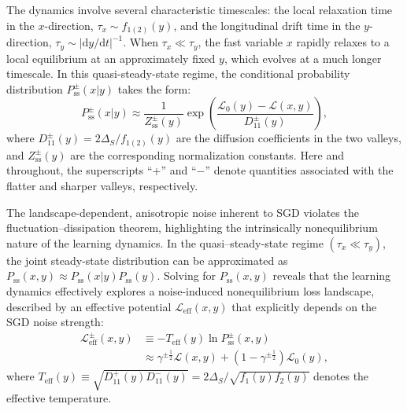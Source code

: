\documentclass[aps,prx,reprint,superscriptaddress,longbibliography,nofootinbib,floatfix]{revtex4-2}
\begin{document}
The dynamics involve several characteristic timescales: the local relaxation time in the $x$-direction, $\tau_x \sim f_{1(2)}(y)$, and the longitudinal drift time in the $y$-direction, $\tau_y \sim |\mathrm{d}y/\mathrm{d}t|^{-1}$. When $\tau_x \ll \tau_y$, the fast variable $x$ rapidly relaxes to a local equilibrium at an approximately fixed $y$, which evolves at a much longer timescale. In this quasi-steady-state regime, the conditional probability distribution $P_\mathrm{ss}^{\pm}(x|y)$ takes the form:
\begin{equation}
    P_\mathrm{ss}^{\pm}(x|y) \approx 
    \frac{1}{Z_\mathrm{ss}^{\pm}(y)}
    \exp\!\left(\frac{\mathcal{L}_0(y) - \mathcal{L}(x,y)}{D_{11}^{\pm}(y)}\right),
\end{equation}
where $D_{11}^{\pm}(y) = 2\Delta_S / f_{1(2)}(y)$ are the diffusion coefficients in the two valleys, and $Z_\mathrm{ss}^{\pm}(y)$ are the corresponding normalization constants. Here and throughout, the superscripts “$+$” and “$-$” denote quantities associated with the flatter and sharper valleys, respectively. 

The landscape-dependent, anisotropic noise inherent to SGD violates the fluctuation–dissipation theorem, highlighting the intrinsically nonequilibrium nature of the learning dynamics. In the quasi–steady-state regime $(\tau_x\ll \tau_y)$, the joint steady-state distribution can be approximated as $P_{\mathrm{ss}}(x,y) \approx P_{\mathrm{ss}}(x|y)P_{\mathrm{ss}}(y)$. Solving for $P_{\mathrm{ss}}(x,y)$ reveals that the learning dynamics effectively explores a noise-induced nonequilibrium loss landscape, described by an effective potential $\mathcal{L}_{\mathrm{eff}}(x,y)$ that explicitly depends on the SGD noise strength:
\begin{equation}
\begin{split}
    \mathcal{L}_{\mathrm{eff}}^{\pm}(x,y)
    &\equiv -T_{\mathrm{eff}}(y)\ln P_\mathrm{ss}^{\pm}(x,y)  \\
    &\approx 
    \gamma^{\pm\frac{1}{2}}\mathcal{L}(x,y)
    +\left(1-\gamma^{\pm\frac{1}{2}}\right)\mathcal{L}_0(y),
\end{split}
\label{eq:effective_loss_SGD}
\end{equation}
where $T_{\mathrm{eff}}(y) \equiv \sqrt{D_{11}^{+}(y)D_{11}^{-}(y)} = 2\Delta_S / \sqrt{f_1(y)f_2(y)}$ denotes the effective temperature.  
\end{document}
